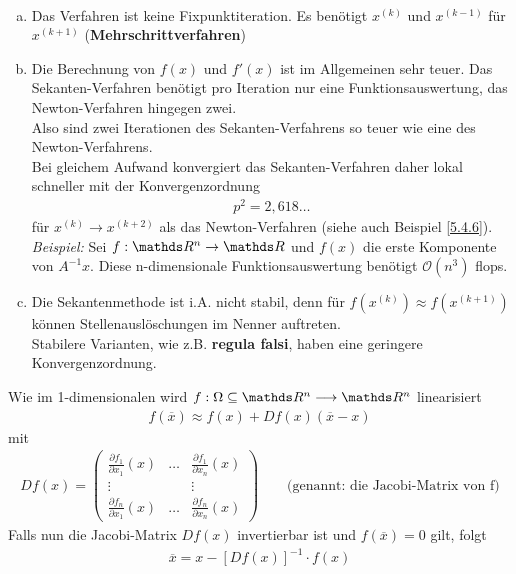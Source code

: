 \begin{Beme}~
	\begin{enumerate}[a)]
		\item Das Verfahren ist keine Fixpunktiteration.
		Es benötigt $x^{(k)}$ und $x^{(k-1)}$ für $x^{(k+1)}$
		(\textbf{Mehrschrittverfahren})
		\item Die Berechnung von $f(x)$ und $f'(x)$ ist im Allgemeinen
		sehr teuer. Das Sekanten-Verfahren benötigt pro Iteration
		nur eine Funktionsauswertung, das Newton-Verfahren hingegen zwei.\\
		Also sind zwei Iterationen des Sekanten-Verfahrens so teuer wie eine
		des Newton-Verfahrens. \\
		Bei gleichem Aufwand konvergiert das Sekanten-Verfahren daher lokal
		schneller mit der Konvergenzordnung 
		\begin{gather*}
		p^2= 2,618\dotsc
		\end{gather*}
		für $x^{(k)}\rightarrow x^{(k+2)}$ als das Newton-Verfahren
		(siehe auch Beispiel \ref{5.4.6}).\\
		
		\textit{Beispiel:} Sei $f:\R^n\rightarrow\R$ und $f(x)$ die erste Komponente von $ A^{-1}x$.
		Diese n-dimensionale Funktionsauswertung benötigt $\mathcal{O}(n^3)$ flops.
		\item Die Sekantenmethode ist i.A. nicht stabil, denn für $f(x^{(k)})\approx f(x^{(k+1)})$
		können Stellenauslöschungen im Nenner auftreten. \\
		Stabilere Varianten, wie z.B. \textbf{regula falsi}, haben eine geringere Konvergenzordnung.
	\end{enumerate}
\end{Beme}



 
Wie im 1-dimensionalen wird $f:\Omega\subseteq \R^n \longrightarrow\R^n$
linearisiert 
\begin{gather}
f(\overline{x}) \approx f(x) +Df(x)(\overline{x}-x)
\label{V.5.1}
\end{gather}
mit
\begin{gather*}
Df(x) = \begin{pmatrix}
\frac{\partial f_1}{\partial x_1}(x) &\dots & \frac{\partial f_1}{\partial x_n}(x)\\
\vdots && \vdots\\
\frac{\partial f_n}{\partial x_1}(x) &\dots & \frac{\partial f_n}{\partial x_n}(x)
\end{pmatrix}
\qquad \text{(genannt: die Jacobi-Matrix von f)}
\end{gather*}
Falls nun die Jacobi-Matrix $Df(x)$ invertierbar ist und $f(\overline{x})= 0$ gilt, folgt
\begin{gather*}
\overline{x} = x-[Df(x)]^{-1}\cdot f(x)
\end{gather*}


